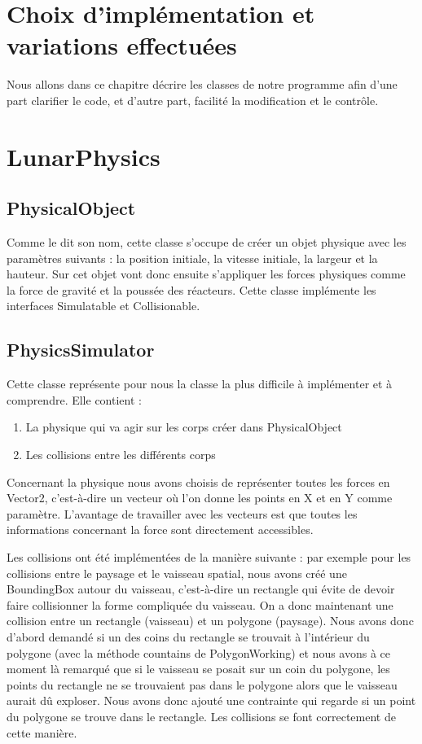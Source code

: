 \section{Choix d'implémentation et variations effectuées}
Nous allons dans ce chapitre décrire les classes de notre programme afin d’une part clarifier le code, et d’autre part, facilité la modification et le contrôle.
\section{LunarPhysics}

\subsection{PhysicalObject}
Comme le dit son nom, cette classe s’occupe de créer un objet physique avec les paramètres suivants : la position initiale, la vitesse initiale, la largeur et la hauteur. Sur cet objet vont donc ensuite s’appliquer les forces physiques comme la force de gravité et la poussée des réacteurs. Cette classe implémente les interfaces Simulatable et Collisionable.

\subsection{PhysicsSimulator}
Cette classe représente pour nous la classe la plus difficile à implémenter et à comprendre. Elle contient :
\begin{enumerate}
\item La physique qui va agir sur les corps créer dans PhysicalObject
\item Les collisions entre les différents corps
\end{enumerate}

Concernant la physique nous avons choisis de représenter toutes les forces en Vector2, c’est-à-dire un vecteur où l’on donne les points en X et en Y comme paramètre. L’avantage de travailler avec les vecteurs est que toutes les informations concernant la force sont directement accessibles.

Les collisions ont été implémentées de la manière suivante : par exemple pour les collisions entre le paysage et le vaisseau spatial, nous avons créé une BoundingBox autour du vaisseau, c’est-à-dire un rectangle qui évite de devoir faire collisionner la forme compliquée du vaisseau. On a donc maintenant une collision entre un rectangle (vaisseau) et un polygone (paysage). Nous avons donc d’abord demandé si un des coins du rectangle se trouvait à l’intérieur du polygone (avec la méthode countains de PolygonWorking) et nous avons à ce moment là remarqué que si le vaisseau se posait sur un coin du polygone, les points du rectangle ne se trouvaient pas dans le polygone alors que le vaisseau aurait dû exploser. Nous avons donc ajouté une contrainte qui regarde si un point du polygone se trouve dans le rectangle. Les collisions se font correctement de cette manière.

